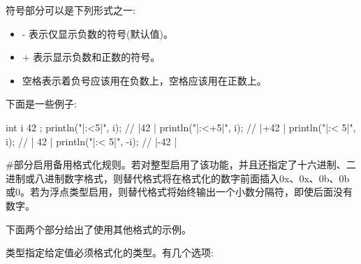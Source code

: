 符号部分可以是下列形式之一:

\begin{itemize}
\item
- 表示仅显示负数的符号(默认值)。

\item
+ 表示显示负数和正数的符号。

\item
空格表示着负号应该用在负数上，空格应该用在正数上。
\end{itemize}

下面是一些例子:

\begin{cpp}
int i { 42 };
println("|{:<5}|", i);   // |42  |
println("|{:<+5}|", i);  // |+42 |
println("|{:< 5}|", i);  // | 42 |
println("|{:< 5}|", -i); // |-42 |
\end{cpp}

\mySamllsection{\#}

\#部分启用备用格式化规则。若对整型启用了该功能，并且还指定了十六进制、二进制或八进制数字格式，则替代格式将在格式化的数字前面插入0x、0x、0b、0b或0。若为浮点类型启用，则替代格式将始终输出一个小数分隔符，即使后面没有数字。

下面两个部分给出了使用其他格式的示例。


类型指定给定值必须格式化的类型。有几个选项:

